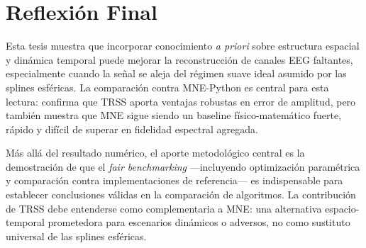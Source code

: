 \section{Reflexión Final}

Esta tesis muestra que incorporar conocimiento \textit{a priori} sobre estructura espacial y dinámica temporal puede mejorar la reconstrucción de canales EEG faltantes, especialmente cuando la señal se aleja del régimen suave ideal asumido por las splines esféricas. La comparación contra MNE-Python es central para esta lectura: confirma que TRSS aporta ventajas robustas en error de amplitud, pero también muestra que MNE sigue siendo un baseline físico-matemático fuerte, rápido y difícil de superar en fidelidad espectral agregada.

Más allá del resultado numérico, el aporte metodológico central es la demostración de que el \textit{fair benchmarking} ---incluyendo optimización paramétrica y comparación contra implementaciones de referencia--- es indispensable para establecer conclusiones válidas en la comparación de algoritmos. La contribución de TRSS debe entenderse como complementaria a MNE: una alternativa espacio-temporal prometedora para escenarios dinámicos o adversos, no como sustituto universal de las splines esféricas.
